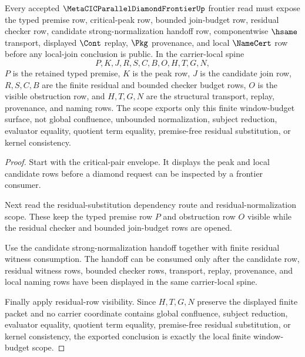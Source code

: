 \begin{theorem}
\label{thm:metacic-parallel-diamond-frontier-window-budget-scope}
Every accepted $\MetaCICParallelDiamondFrontierUp$ frontier read must expose the typed premise row, critical-peak row, bounded join-budget row, residual checker row, candidate strong-normalization handoff row, componentwise $\hsame$ transport, displayed $\Cont$ replay, $\Pkg$ provenance, and local $\NameCert$ row before any local-join conclusion is public. In the carrier-local spine
$$
P,K,J,R,S,C,B,O,H,T,G,N ,
$$
$P$ is the retained typed premise, $K$ is the peak row, $J$ is the candidate join row, $R,S,C,B$ are the finite residual and bounded checker budget rows, $O$ is the visible obstruction row, and $H,T,G,N$ are the structural transport, replay, provenance, and naming rows. The scope exports only this finite window-budget surface, not global confluence, unbounded normalization, subject reduction, evaluator equality, quotient term equality, premise-free residual substitution, or kernel consistency.
\end{theorem}
\begin{proof}
Start with the critical-pair envelope. It displays the peak and local candidate rows before a diamond request can be inspected by a frontier consumer.

Next read the residual-substitution dependency route and residual-normalization scope. These keep the typed premise row $P$ and obstruction row $O$ visible while the residual checker and bounded join-budget rows are opened.

Use the candidate strong-normalization handoff together with finite residual witness consumption. The handoff can be consumed only after the candidate row, residual witness rows, bounded checker rows, transport, replay, provenance, and local naming rows have been displayed in the same carrier-local spine.

Finally apply residual-row visibility. Since $H,T,G,N$ preserve the displayed finite packet and no carrier coordinate contains global confluence, subject reduction, evaluator equality, quotient term equality, premise-free residual substitution, or kernel consistency, the exported conclusion is exactly the local finite window-budget scope.
\end{proof}
